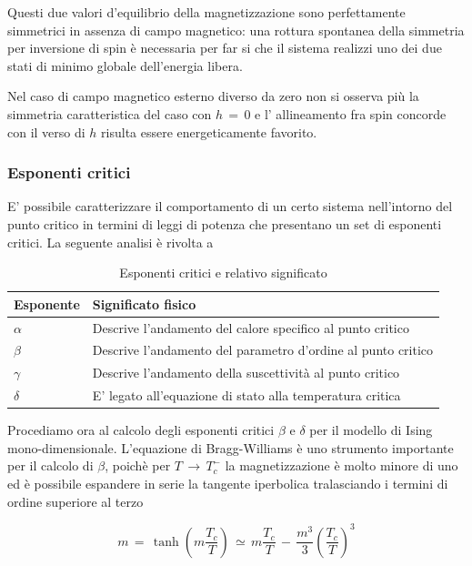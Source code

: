 Questi due valori d'equilibrio della magnetizzazione sono perfettamente simmetrici in assenza di campo magnetico: una 
rottura spontanea della simmetria per inversione di spin è necessaria per far si che il sistema realizzi uno dei due stati di 
minimo globale dell'energia libera. 

Nel caso di campo magnetico esterno diverso da zero non si osserva più la simmetria caratteristica del caso con $h\,=\,0$ e l'
allineamento fra spin concorde con il verso di $h$ risulta essere energeticamente favorito.



\subsubsection{Esponenti critici}

E' possibile caratterizzare il comportamento di un certo sistema nell'intorno del punto critico in termini di leggi di potenza 
che presentano un set di esponenti critici. La seguente analisi è rivolta a 

\begin{table}[h!]
    \centering
    \begin{tabular}{|>{\centering\arraybackslash}p{2cm}|>{\centering\arraybackslash}p{11cm}|}
    \hline
    \textbf{Esponente} & \textbf{Significato fisico} \\ 
    \hline
    $\alpha$ & Descrive l'andamento del calore specifico al punto critico \\ 
    \hline
    $\beta$ & Descrive l'andamento del parametro d'ordine al punto critico \\ 
    \hline
    $\gamma$ & Descrive l'andamento della suscettività al punto critico \\ 
    \hline
    $\delta$ & E' legato all'equazione di stato alla temperatura critica \\ 
    \hline
    \end{tabular}
    \caption{Esponenti critici e relativo significato}
\end{table}

Procediamo ora al calcolo degli esponenti critici $\beta$ e $\delta$ per il modello di Ising mono-dimensionale. L'equazione di Bragg-Williams 
è uno strumento importante per il calcolo di $\beta$, poichè per $T\,\to\,T^-_c$ la magnetizzazione è molto minore di uno ed è possibile 
espandere in serie la tangente iperbolica tralasciando i termini di ordine superiore al terzo 

\begin{equation}
    m\,=\,\tanh{\left(m\frac{T_c}{T}\right)}\,\simeq\,m\frac{T_c}{T}\,-\,\frac{m^3}{3}\left(\frac{T_c}{T}\right)^3
    \label{eq: beta_fp_Ising1D_MF}
\end{equation}

